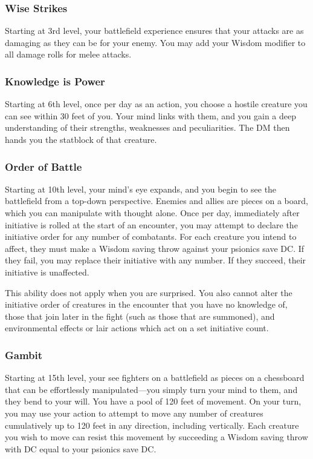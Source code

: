\subsubsection{Wise Strikes}
Starting at 3rd level,
your battlefield experience ensures that your attacks
are as damaging as they can be for your enemy.
You may add your Wisdom modifier to all damage
rolls for melee attacks. 

\subsubsection{Knowledge is Power}
Starting at 6th level,
once per day as an action,
you choose a hostile creature you can see within
30 feet of you.
Your mind links with them,
and you gain a deep understanding of their
strengths, weaknesses and peculiarities.
The DM then hands you the statblock of that creature.

\subsubsection{Order of Battle}
Starting at 10th level,
your mind's eye expands,
and you begin to see the battlefield from a top-down perspective.
Enemies and allies are pieces on a board, which you can manipulate
with thought alone.
Once per day,
immediately after initiative is rolled at the start of an encounter,
you may attempt to declare the initiative order for
any number of combatants.
For each creature you intend to affect,
they must make a Wisdom saving throw against your psionics save DC.
If they fail, you may replace their initiative with any number.
If they succeed, their initiative is unaffected. 

This ability does not apply when you are surprised.
You also cannot alter the initiative order of creatures
in the encounter that you have no knowledge of,
those that join later in the fight (such as those
that are summoned),
and environmental effects or lair actions
which act on a set initiative count.

\subsubsection{Gambit}
Starting at 15th level,
your see fighters on a battlefield as pieces on a chessboard
that can be effortlessly manipulated---you simply turn your
mind to them, and they bend to your will.
You have a pool of 120 feet of movement.
On your turn,
you may use your action to attempt to move any number of creatures
cumulatively up to 120 feet in any direction,
including vertically.
Each creature you wish to move can resist this movement by
succeeding a Wisdom saving throw with DC equal to your
psionics save DC.

